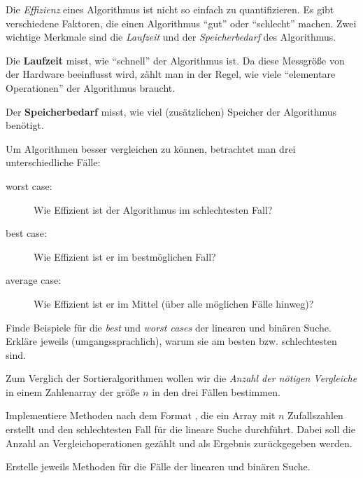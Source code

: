 \documentclass[10pt, a4paper, ngerman]{arbeitsblatt}
\begin{document}
\ReiheTitel

\begin{infobox}\small
	Die \emph{Effizienz} eines Algorithmus ist nicht so einfach zu quantifizieren.
	Es gibt verschiedene Faktoren, die einen Algorithmus \enquote{gut} oder \enquote{schlecht}
	machen. Zwei wichtige Merkmale sind die \emph{Laufzeit} und der \emph{Speicherbedarf}
	des Algorithmus.

	Die \textbf{Laufzeit} misst, wie \enquote{schnell} der Algorithmus ist. Da diese Messgröße
	von der Hardware beeinflusst wird, zählt man in der Regel, wie viele \enquote{elementare
	Operationen} der Algorithmus braucht.

	Der \textbf{Speicherbedarf} misst, wie viel (zusätzlichen) Speicher der Algorithmus benötigt.

	\smallskip
	Um Algorithmen besser vergleichen zu können, betrachtet man drei unterschiedliche
	Fälle:
	\begin{description}
		\item[worst case:] Wie Effizient ist der Algorithmus im schlechtesten Fall?
		\item[best case:] Wie Effizient ist er im bestmöglichen Fall?
		\item[average case:] Wie Effizient ist er im Mittel (über alle möglichen Fälle hinweg)?
	\end{description}
	\smallskip
\end{infobox}

\begin{aufgabe}[icon=\iconHeft]
	\label{aufg:cases-ermitteln}
	Finde Beispiele für die \emph{best} und \emph{worst cases} der linearen und binären Suche. Erkläre
	jeweils (umgangssprachlich), warum sie am besten bzw. schlechtesten sind.
\end{aufgabe}

\begin{aufgabe}[icon=\iconComputer]
	\label{aufg:cases-zaehlen}
	Zum Verglich der Sortieralgorithmen wollen wir die \emph{Anzahl der nötigen Vergleiche}
	in einem Zahlenarray der größe $n$ in den drei Fällen bestimmen.


	Implementiere Methoden nach dem Format , die ein
	Array mit $n$ Zufallszahlen erstellt und den schlechtesten Fall für die lineare Suche durchführt.
	Dabei soll die Anzahl an Vergleichoperationen gezählt und als Ergebnis zurückgegeben werden.

	Erstelle jeweils Methoden für die Fälle der linearen und binären Suche.

\end{aufgabe}
\end{document}
